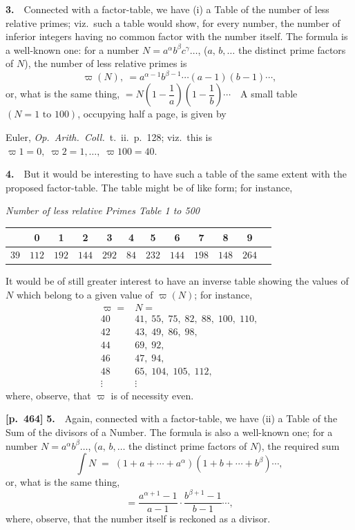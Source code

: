 \documentclass[11pt,a4paper]{article}
\providecommand{\totient}{\varpi}
\providecommand{\sumdiv}{{\textstyle\int}}
\begin{document}
\textbf{3.}\ \ Connected with a factor-table, we have (i) a Table of the number of less relative primes; viz.\ such a table would show, for every number, the number of inferior integers having no common factor with the number itself.   The formula is a well-known one: for a number $N=a^\alpha b^\beta c^\gamma\ldots$, ($a,\,b,\ldots$ the distinct prime factors of $N$), the number of less relative primes is
\[
\totient(N),\ =a^{\alpha-1}b^{\beta-1}\cdots(a-1)(b-1)\cdots,
\]
or, what is the same thing, $=N\!\left(1-\dfrac{1}{a}\right)\!\left(1-\dfrac{1}{b}\right)\cdots$\ \ A small table $(N=1\text{ to }100)$, occupying half a page, is given by

Euler, \textit{Op.\ Arith.\ Coll.}\ t.~ii.\ p.~128; viz.\ this is $\totient 1=0,\;\totient 2=1,\ldots,\;\totient 100=40$.

\textbf{4.}\ \ But it would be interesting to have such a table of the same extent with the proposed factor-table.   The table might be of like form; for instance,

\begin{center}
\textit{Number of less relative Primes Table 1 to 500}
\end{center}

\begin{center}
\renewcommand{\arraystretch}{1.1}
\begin{tabular}{c|ccccccccccc}
\hline
 & 0 & 1 & 2 & 3 & 4 & 5 & 6 & 7 & 8 & 9 \\
\hline
39 & $112$ & $192$ & $144$ & $292$ & $84$ & $232$ & $144$ & $198$ & $148$ & $264$ \\
\hline
\end{tabular}
\end{center}

It would be of still greater interest to have an inverse table showing the values of $N$ which belong to a given value of $\totient(N)$; for instance,
\[
\begin{array}{r|l}
\totient= & N= \\\hline
40 & 41,\;55,\;75,\;82,\;88,\;100,\;110, \\
42 & 43,\;49,\;86,\;98, \\
44 & 69,\;92, \\
46 & 47,\;94, \\
48 & 65,\;104,\;105,\;112,\\
\vdots & \vdots
\end{array}
\]
where, observe, that $\totient$ is of necessity even.

\bigskip
\noindent\textbf{[p.~464]}\quad
\textbf{5.}\ \ Again, connected with a factor-table, we have (ii) a Table of the Sum of the divisors of a Number.   The formula is also a well-known one; for a number $N=a^\alpha b^\beta\ldots$, ($a,\,b,\ldots$ the distinct prime factors of $N$), the required sum
\[
\sumdiv N\;=\;(1+a+\cdots+a^\alpha)(1+b+\cdots+b^\beta)\cdots,
\]
or, what is the same thing,
\[
=\frac{a^{\alpha+1}-1}{a-1}\cdot\frac{b^{\beta+1}-1}{b-1}\cdots,
\]
where, observe, that the number itself is reckoned as a divisor.
\end{document}
